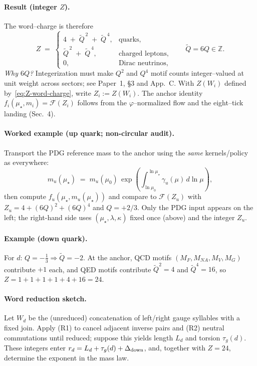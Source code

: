\documentclass[epjc3]{svjour3}
\begin{document}
\paragraph{Result (integer $Z$).}
The word--charge is therefore
\begin{equation}
  Z \;=\;
  \begin{cases}
    4\;+\;\tilde Q^{\,2}\;+\;\tilde Q^{\,4}, & \text{quarks},\\[4pt]
    \tilde Q^{\,2}\;+\;\tilde Q^{\,4}, & \text{charged leptons},\\[4pt]
    0, & \text{Dirac neutrinos},
  \end{cases}
  \qquad \tilde Q=6Q\in\mathbb{Z}.
  \label{eq:Z-word-charge}
\end{equation}
\emph{Why $6Q$?} Integerization must make $Q^2$ and $Q^4$ motif counts integer--valued at unit weight across sectors; see Paper~1, \S3 and App.~C.
With $Z(W_i)$ defined by~\eqref{eq:Z-word-charge}, write $Z_i:=Z(W_i)$. The anchor identity $f_i(\mu_\star,m_i)=\mathcal F(Z_i)$ follows from the $\varphi$--normalized flow and the eight--tick landing (Sec.~4).

\paragraph{Worked example (up quark; non-circular audit).}
Transport the PDG reference mass to the anchor using the \emph{same} kernels/policy as everywhere:
\[
  m_u(\mu_\star)\;=\;m_u(\mu_0)\,
  \exp\!\!\left(\int_{\ln\mu_0}^{\ln\mu_\star}\gamma_u(\mu)\,d\ln\mu\right),
\]
then compute
\(
  f_u(\mu_\star, m_u(\mu_\star))
\)
and compare to
\(
  \mathcal F(Z_u)
\)
with $Z_u=4+(6Q)^2+(6Q)^4$ and $Q=+2/3$. Only the PDG input appears on the left; the right-hand side uses $(\mu_\star,\lambda,\kappa)$ fixed once (above) and the integer $Z_u$.

\paragraph{Example (down quark).}
For $d$: $Q=-\tfrac13 \Rightarrow \tilde Q=-2$. At the anchor, QCD motifs $(M_F,M_{NA},M_V,M_G)$ contribute $+1$ each, and QED motifs contribute $\tilde Q^2=4$ and $\tilde Q^4=16$, so
\(
Z=1+1+1+1+4+16 = 24
\).
\paragraph{Word reduction sketch.}
Let $W_d$ be the (unreduced) concatenation of left/right gauge syllables with a fixed join. Apply (R1) to cancel adjacent inverse pairs and (R2) neutral commutations until reduced; suppose this yields length $L_d$ and torsion $\tau_g(d)$. These integers enter
\(
r_d = L_d + \tau_g(d) + \Delta_{\rm down}
\),
and, together with $Z=24$, determine the exponent in the mass law.
\end{document}
